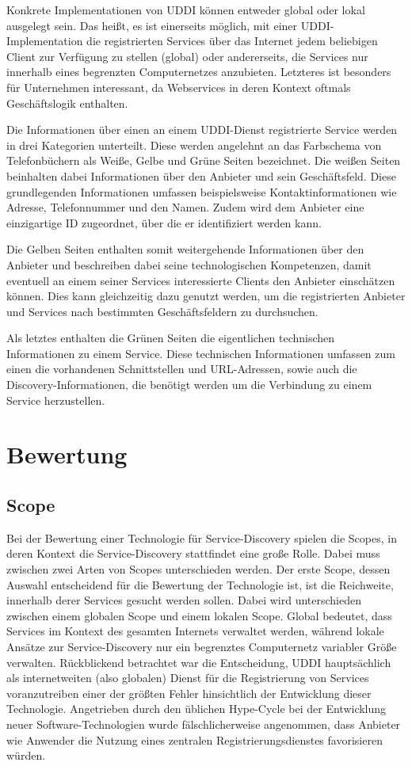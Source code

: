 \documentclass[conference,compsoc]{IEEEtran}
\begin{document}
Konkrete Implementationen von UDDI können entweder global oder lokal ausgelegt sein. Das heißt, es ist einerseits möglich, mit einer UDDI-Implementation die registrierten Services über das Internet jedem beliebigen Client zur Verfügung zu stellen (global) oder andererseits, die Services nur innerhalb eines begrenzten Computernetzes anzubieten. Letzteres ist besonders für Unternehmen interessant, da Webservices in deren Kontext oftmals Geschäftslogik enthalten.

Die Informationen über einen an einem UDDI-Dienst registrierte Service werden in drei Kategorien unterteilt. Diese werden angelehnt an das Farbschema von Telefonbüchern als Weiße, Gelbe und Grüne Seiten bezeichnet. Die weißen Seiten beinhalten dabei Informationen über den Anbieter und sein Geschäftsfeld. Diese grundlegenden Informationen umfassen beispielsweise Kontaktinformationen wie Adresse, Telefonnummer und den Namen. Zudem wird dem Anbieter eine einzigartige ID zugeordnet, über die er identifiziert werden kann.

Die Gelben Seiten enthalten somit weitergehende Informationen über den Anbieter und beschreiben dabei seine technologischen Kompetenzen, damit eventuell an einem seiner Services interessierte Clients den Anbieter einschätzen können. Dies kann gleichzeitig dazu genutzt werden, um die registrierten Anbieter und Services nach bestimmten Geschäftsfeldern zu durchsuchen.

Als letztes enthalten die Grünen Seiten die eigentlichen technischen Informationen zu einem Service. Diese technischen Informationen umfassen zum einen die vorhandenen Schnittstellen und URL-Adressen, sowie auch die Discovery-Informationen, die benötigt werden um die Verbindung zu einem Service herzustellen.

\section{Bewertung}

\subsection{Scope}

Bei der Bewertung einer Technologie für Service-Discovery spielen die Scopes, in deren Kontext die Service-Discovery stattfindet eine große Rolle. Dabei muss zwischen zwei Arten von Scopes unterschieden werden.
Der erste Scope, dessen Auswahl entscheidend für die Bewertung der Technologie ist, ist die Reichweite, innerhalb derer Services gesucht werden sollen. Dabei wird unterschieden zwischen einem globalen Scope und einem lokalen Scope. Global bedeutet, dass Services im Kontext des gesamten Internets verwaltet werden, während lokale Ansätze zur Service-Discovery nur ein begrenztes Computernetz variabler Größe verwalten. Rückblickend betrachtet war die Entscheidung, UDDI hauptsächlich als internetweiten (also globalen) Dienst für die Registrierung von Services voranzutreiben einer der größten Fehler hinsichtlich der Entwicklung dieser Technologie. Angetrieben durch den üblichen Hype-Cycle bei der Entwicklung neuer Software-Technologien wurde fälschlicherweise angenommen, dass Anbieter wie Anwender die Nutzung eines zentralen Registrierungsdienstes favorisieren würden.
\end{document}
